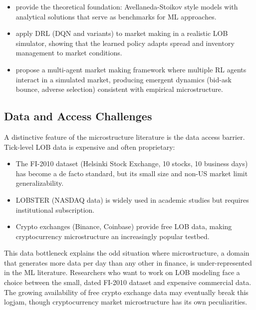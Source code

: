 \begin{itemize}[leftmargin=*]
    \item \citet{Gueant2017} provide the theoretical foundation: Avellaneda-Stoikov style models with analytical solutions that serve as benchmarks for ML approaches.

    \item \citet{Spooner2018} apply DRL (DQN and variants) to market making in a realistic LOB simulator, showing that the learned policy adapts spread and inventory management to market conditions.

    \item \citet{Gasperov2021} propose a multi-agent market making framework where multiple RL agents interact in a simulated market, producing emergent dynamics (bid-ask bounce, adverse selection) consistent with empirical microstructure.
\end{itemize}

\subsection{Data and Access Challenges}

A distinctive feature of the microstructure literature is the data access barrier. Tick-level LOB data is expensive and often proprietary:

\begin{itemize}[leftmargin=*]
    \item The FI-2010 dataset \citep{Ntakaris2018} (Helsinki Stock Exchange, 10 stocks, 10 business days) has become a de facto standard, but its small size and non-US market limit generalizability.
    \item LOBSTER (NASDAQ data) is widely used in academic studies but requires institutional subscription.
    \item Crypto exchanges (Binance, Coinbase) provide free LOB data, making cryptocurrency microstructure an increasingly popular testbed.
\end{itemize}

This data bottleneck explains the odd situation where microstructure, a domain that generates more data per day than any other in finance, is under-represented in the ML literature. Researchers who want to work on LOB modeling face a choice between the small, dated FI-2010 dataset and expensive commercial data. The growing availability of free crypto exchange data may eventually break this logjam, though cryptocurrency market microstructure has its own peculiarities.
